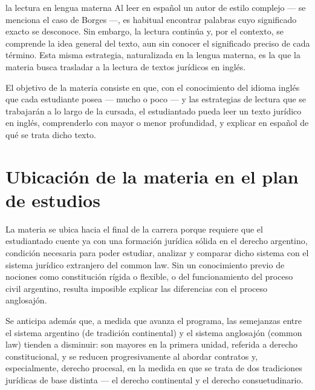 \documentclass[12pt,oneside]{book}
\begin{document}
\begin{example}{la lectura en lengua materna}
Al leer en español un autor de estilo complejo --- se menciona el caso de Borges ---, es habitual encontrar palabras cuyo significado exacto se desconoce. Sin embargo, la lectura continúa y, por el contexto, se comprende la idea general del texto, aun sin conocer el significado preciso de cada término. Esta misma estrategia, naturalizada en la lengua materna, es la que la materia busca trasladar a la lectura de textos jurídicos en inglés.
\end{example}

\begin{important}
El objetivo de la materia consiste en que, con el conocimiento del idioma inglés que cada estudiante posea --- mucho o poco --- y las estrategias de lectura que se trabajarán a lo largo de la cursada, el estudiantado pueda leer un texto jurídico en inglés, comprenderlo con mayor o menor profundidad, y explicar en español de qué se trata dicho texto.
\end{important}

\section{Ubicación de la materia en el plan de estudios}

La materia se ubica hacia el final de la carrera porque requiere que el estudiantado cuente ya con una formación jurídica sólida en el derecho argentino, condición necesaria para poder estudiar, analizar y comparar dicho sistema con el sistema jurídico extranjero del common law. Sin un conocimiento previo de nociones como constitución rígida o flexible, o del funcionamiento del proceso civil argentino, resulta imposible explicar las diferencias con el proceso anglosajón.

Se anticipa además que, a medida que avanza el programa, las semejanzas entre el sistema argentino (de tradición continental) y el sistema anglosajón (common law) tienden a disminuir: son mayores en la primera unidad, referida a derecho constitucional, y se reducen progresivamente al abordar contratos y, especialmente, derecho procesal, en la medida en que se trata de dos tradiciones jurídicas de base distinta --- el derecho continental y el derecho consuetudinario.
\end{document}
